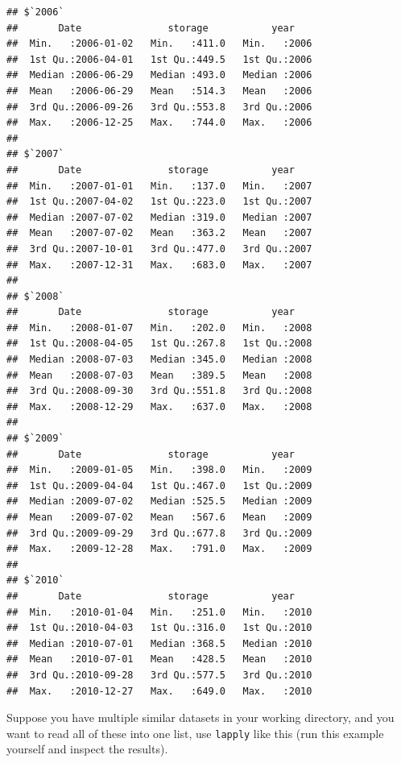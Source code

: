 \documentclass[]{book}
\begin{document}
\begin{verbatim}
## $`2006`
##       Date               storage           year     
##  Min.   :2006-01-02   Min.   :411.0   Min.   :2006  
##  1st Qu.:2006-04-01   1st Qu.:449.5   1st Qu.:2006  
##  Median :2006-06-29   Median :493.0   Median :2006  
##  Mean   :2006-06-29   Mean   :514.3   Mean   :2006  
##  3rd Qu.:2006-09-26   3rd Qu.:553.8   3rd Qu.:2006  
##  Max.   :2006-12-25   Max.   :744.0   Max.   :2006  
## 
## $`2007`
##       Date               storage           year     
##  Min.   :2007-01-01   Min.   :137.0   Min.   :2007  
##  1st Qu.:2007-04-02   1st Qu.:223.0   1st Qu.:2007  
##  Median :2007-07-02   Median :319.0   Median :2007  
##  Mean   :2007-07-02   Mean   :363.2   Mean   :2007  
##  3rd Qu.:2007-10-01   3rd Qu.:477.0   3rd Qu.:2007  
##  Max.   :2007-12-31   Max.   :683.0   Max.   :2007  
## 
## $`2008`
##       Date               storage           year     
##  Min.   :2008-01-07   Min.   :202.0   Min.   :2008  
##  1st Qu.:2008-04-05   1st Qu.:267.8   1st Qu.:2008  
##  Median :2008-07-03   Median :345.0   Median :2008  
##  Mean   :2008-07-03   Mean   :389.5   Mean   :2008  
##  3rd Qu.:2008-09-30   3rd Qu.:551.8   3rd Qu.:2008  
##  Max.   :2008-12-29   Max.   :637.0   Max.   :2008  
## 
## $`2009`
##       Date               storage           year     
##  Min.   :2009-01-05   Min.   :398.0   Min.   :2009  
##  1st Qu.:2009-04-04   1st Qu.:467.0   1st Qu.:2009  
##  Median :2009-07-02   Median :525.5   Median :2009  
##  Mean   :2009-07-02   Mean   :567.6   Mean   :2009  
##  3rd Qu.:2009-09-29   3rd Qu.:677.8   3rd Qu.:2009  
##  Max.   :2009-12-28   Max.   :791.0   Max.   :2009  
## 
## $`2010`
##       Date               storage           year     
##  Min.   :2010-01-04   Min.   :251.0   Min.   :2010  
##  1st Qu.:2010-04-03   1st Qu.:316.0   1st Qu.:2010  
##  Median :2010-07-01   Median :368.5   Median :2010  
##  Mean   :2010-07-01   Mean   :428.5   Mean   :2010  
##  3rd Qu.:2010-09-28   3rd Qu.:577.5   3rd Qu.:2010  
##  Max.   :2010-12-27   Max.   :649.0   Max.   :2010
\end{verbatim}

Suppose you have multiple similar datasets in your working directory, and you want to read all of these into one list, use \texttt{lapply} like this (run this example yourself and inspect the results).
\end{document}
